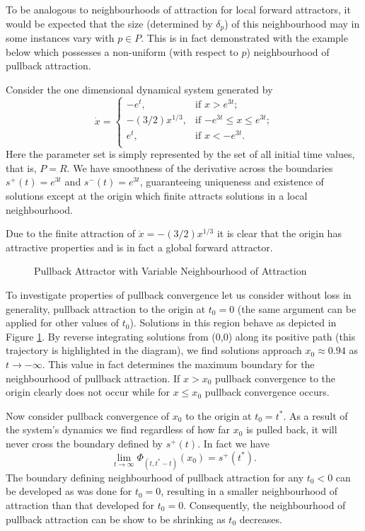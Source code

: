 \documentclass{article}
\begin{document}
To be analogous to neighbourhoods of attraction for local forward
attractors, it would be expected that the size (determined by
$\delta_p$) of this neighbourhood may in some instances vary with
$p \in P$. This is in fact demonstrated with the example below
which possesses a non-uniform (with respect to $p$) neighbourhood
of pullback attraction.

\begin{example}\label{pavnhoodeg}
Consider the one dimensional dynamical system generated by
\begin{equation*}
  \dot{x} =
     \begin{cases}
       - e^t, & \text{if $x > e^{3t}$;} \\
       - (3/2)x^{1/3}, & \text{if $-e^{3t} \leq x \leq e^{3t}$;} \\
       e^{t}, & \text{if $x < -e^{3t}$.} \\
     \end{cases}
\end{equation*}
Here the parameter set is simply represented by the set of all initial time
values, that is, $P = R$. We have smoothness of the
derivative across the boundaries  $s^+(t) = e^{3t}$ and $s^-(t) =
e^{3t}$, guaranteeing uniqueness and existence
of solutions except at the origin which finite attracts solutions in
a local neighbourhood.

Due to the finite attraction of $\dot{x} = -(3/2)x^{1/3}$ it is clear that the
origin has attractive properties and is in fact a global forward attractor.
\begin{figure}[hb]
\begin{center}

\caption{Pullback Attractor with Variable Neighbourhood of Attraction}
\protect\label{pavnhoodfig}
\end{center}
\end{figure}
To investigate properties of pullback convergence let us consider without loss
in generality, pullback attraction to the origin at $t_0=0$ (the same argument
can be applied for other values of $t_0$). Solutions in this region behave as
depicted in Figure \ref{pavnhoodfig}. By reverse integrating solutions from
(0,0) along its positive path (this trajectory is highlighted in the diagram),
we find solutions approach $x_0 \approx 0.94$ as $t \to -\infty$. This value in
fact determines the maximum boundary for the neighbourhood of pullback
attraction. If $x > x_0$ pullback convergence to the origin clearly does not
occur while for $x \leq x_0$ pullback convergence occurs.

Now consider pullback convergence of $x_0$ to the origin at $t_0 = t^*$. As a
result of the system's dynamics we find regardless of how far $x_0$ is pulled
back, it will never cross the boundary defined by $s^+(t)$. In fact we have
\[ \lim_{t \to \infty} \Phi_{(t, t^*-t)}(x_0) = s^+(t^*). \]
The boundary defining neighbourhood of pullback attraction for any $t_0 < 0$
can be developed as was done for $t_0 = 0$, resulting in a smaller
neighbourhood of attraction than that developed for $t_0 = 0$.
Consequently, the neighbourhood of pullback attraction can be show to
be shrinking as $t_0$ decreases.
\end{example}
\end{document}
